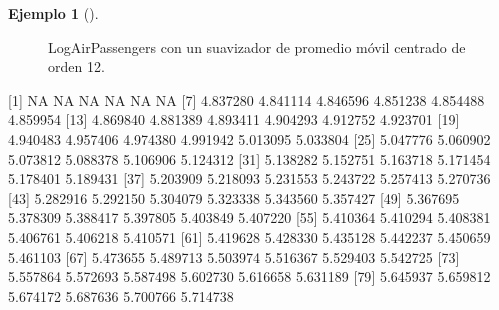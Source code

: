 \documentclass[
  us-letterpaper,
]{scrreprt}
\newenvironment{Shaded}{\begin{snugshade}}{\end{snugshade}}
\newcommand{\ConstantTok}[1]{\textcolor[rgb]{0.56,0.35,0.01}{#1}}
\newcommand{\DecValTok}[1]{\textcolor[rgb]{0.68,0.00,0.00}{#1}}
\newcommand{\FloatTok}[1]{\textcolor[rgb]{0.68,0.00,0.00}{#1}}
\newcommand{\NormalTok}[1]{\textcolor[rgb]{0.00,0.23,0.31}{#1}}
\theoremstyle{plain}
\theoremstyle{definition}
\theoremstyle{definition}
\newtheorem{example}{Ejemplo}[chapter]
\theoremstyle{plain}
\theoremstyle{remark}
\begin{document}
\begin{example}[]
\begin{tcolorbox}
\begin{enumerate}
\begin{figure}[H]
{  }

  \caption{\label{fig-sm12p}LogAirPassengers con un suavizador de
  promedio móvil centrado de orden 12.}

  \end{figure}%

\begin{Shaded}
\begin{Highlighting}[]
\NormalTok{  [}\DecValTok{1}\NormalTok{]       }\ConstantTok{NA}       \ConstantTok{NA}       \ConstantTok{NA}       \ConstantTok{NA}       \ConstantTok{NA}       \ConstantTok{NA}
\NormalTok{  [}\DecValTok{7}\NormalTok{] }\FloatTok{4.837280} \FloatTok{4.841114} \FloatTok{4.846596} \FloatTok{4.851238} \FloatTok{4.854488} \FloatTok{4.859954}
\NormalTok{ [}\DecValTok{13}\NormalTok{] }\FloatTok{4.869840} \FloatTok{4.881389} \FloatTok{4.893411} \FloatTok{4.904293} \FloatTok{4.912752} \FloatTok{4.923701}
\NormalTok{ [}\DecValTok{19}\NormalTok{] }\FloatTok{4.940483} \FloatTok{4.957406} \FloatTok{4.974380} \FloatTok{4.991942} \FloatTok{5.013095} \FloatTok{5.033804}
\NormalTok{ [}\DecValTok{25}\NormalTok{] }\FloatTok{5.047776} \FloatTok{5.060902} \FloatTok{5.073812} \FloatTok{5.088378} \FloatTok{5.106906} \FloatTok{5.124312}
\NormalTok{ [}\DecValTok{31}\NormalTok{] }\FloatTok{5.138282} \FloatTok{5.152751} \FloatTok{5.163718} \FloatTok{5.171454} \FloatTok{5.178401} \FloatTok{5.189431}
\NormalTok{ [}\DecValTok{37}\NormalTok{] }\FloatTok{5.203909} \FloatTok{5.218093} \FloatTok{5.231553} \FloatTok{5.243722} \FloatTok{5.257413} \FloatTok{5.270736}
\NormalTok{ [}\DecValTok{43}\NormalTok{] }\FloatTok{5.282916} \FloatTok{5.292150} \FloatTok{5.304079} \FloatTok{5.323338} \FloatTok{5.343560} \FloatTok{5.357427}
\NormalTok{ [}\DecValTok{49}\NormalTok{] }\FloatTok{5.367695} \FloatTok{5.378309} \FloatTok{5.388417} \FloatTok{5.397805} \FloatTok{5.403849} \FloatTok{5.407220}
\NormalTok{ [}\DecValTok{55}\NormalTok{] }\FloatTok{5.410364} \FloatTok{5.410294} \FloatTok{5.408381} \FloatTok{5.406761} \FloatTok{5.406218} \FloatTok{5.410571}
\NormalTok{ [}\DecValTok{61}\NormalTok{] }\FloatTok{5.419628} \FloatTok{5.428330} \FloatTok{5.435128} \FloatTok{5.442237} \FloatTok{5.450659} \FloatTok{5.461103}
\NormalTok{ [}\DecValTok{67}\NormalTok{] }\FloatTok{5.473655} \FloatTok{5.489713} \FloatTok{5.503974} \FloatTok{5.516367} \FloatTok{5.529403} \FloatTok{5.542725}
\NormalTok{ [}\DecValTok{73}\NormalTok{] }\FloatTok{5.557864} \FloatTok{5.572693} \FloatTok{5.587498} \FloatTok{5.602730} \FloatTok{5.616658} \FloatTok{5.631189}
\NormalTok{ [}\DecValTok{79}\NormalTok{] }\FloatTok{5.645937} \FloatTok{5.659812} \FloatTok{5.674172} \FloatTok{5.687636} \FloatTok{5.700766} \FloatTok{5.714738}

\end{Highlighting}
\end{Shaded}
\end{enumerate}
\end{tcolorbox}
\end{example}
\end{document}
